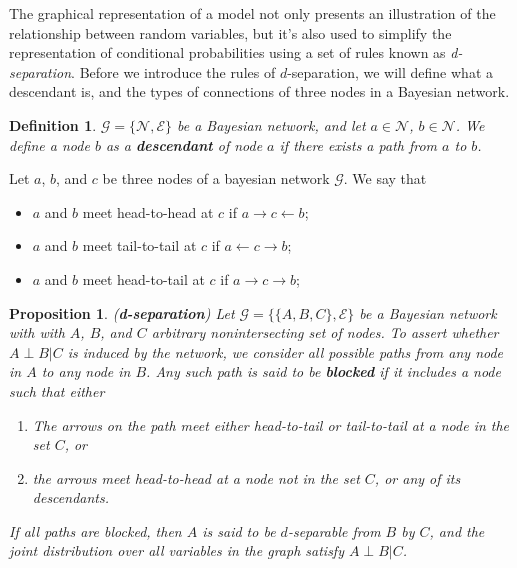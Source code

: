 \documentclass[11pt]{article}
\numberwithin{equation}{section}
\newtheorem{definition}{Definition}[section]
\newtheorem{proposition}{Proposition}[section]
\begin{document}
The graphical representation of a model not only presents an illustration of the relationship between random variables, but it's also used to simplify the representation of conditional probabilities using a set of rules known as \textit{d-separation}. Before we introduce the rules of $d$-separation, we will define what a descendant is, and the types of connections of three nodes in a Bayesian network.

\begin{definition}
	$\mathcal G = \{\mathscr{N}, \mathscr{E}\}$ be a Bayesian network, and let $a \in \mathscr{N}$, $b \in \mathscr{N}$. We define a node $b$ as a \textbf{descendant} of node $a$ if there exists a path from $a$ to $b$.
\end{definition}

Let $a$, $b$, and $c$ be three nodes of a bayesian network $\mathcal G$. We say that
\begin{itemize}
	\item $a$ and $b$ meet head-to-head at $c$ if $a \rightarrow c \leftarrow b $;
	\item $a$ and $b$ meet tail-to-tail at $c$ if $a \leftarrow c \rightarrow b $;
	\item $a$ and $b$ meet head-to-tail at $c$ if $a \rightarrow c \rightarrow b $;
\end{itemize}

\begin{proposition}
	(\textbf{d-separation}) Let $\mathcal G = \{\{A, B, C\}, \mathscr{E}\}$ be a Bayesian network with with $A$, $B$, and $C$ arbitrary nonintersecting set of nodes. To assert whether $A \perp B \vert C$ is induced by the network, we consider all possible paths from any node in $A$ to any node in $B$. Any such path is said to be \textbf{blocked} if it includes a node such that either
	\begin{enumerate}
		\item The arrows on the path meet either head-to-tail or tail-to-tail at a node in the set $C$, or
		\item the arrows meet head-to-head at a node not in the set $C$, or any of its descendants.
	\end{enumerate}
	If all paths are blocked, then $A$ is said to be $d$-separable from $B$ by $C$, and the joint distribution over all variables in the graph satisfy $A \perp B \vert C$.
\end{proposition}

\end{document}
